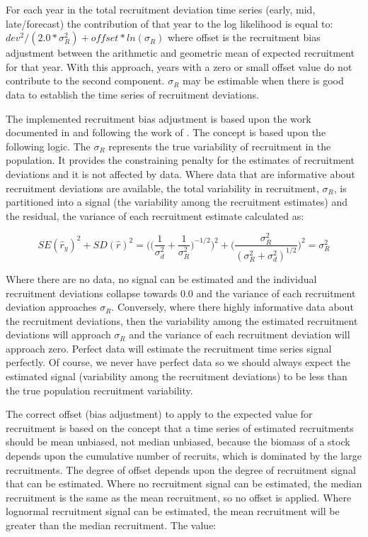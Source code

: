 \hypertarget{RecBias}{}
For each year in the total recruitment deviation time series (early, mid, late/forecast) the contribution of that year to the log likelihood is equal to: $dev^2/(2.0*\sigma^2_R)+offset*ln(\sigma_R)$ where offset is the recruitment bias adjustment between the arithmetic and geometric mean of expected recruitment for that year. With this approach, years with a zero or small offset value do not contribute to the second component. $\sigma_R$ may be estimable when there is good data to establish the time series of recruitment deviations.

The implemented recruitment bias adjustment is based upon the work documented in \citet{methot-adjusting-2011} and following the work of \citet{maunder-estimation-2003}. The concept is based upon the following logic. The $\sigma_R$ represents the true variability of recruitment in the population. It provides the constraining penalty for the estimates of recruitment deviations and it is not affected by data. Where data that are informative about recruitment deviations are available, the total variability in recruitment, $\sigma_R$, is partitioned into a signal (the variability among the recruitment estimates) and the residual, the variance of each recruitment estimate calculated as:

\begin{equation}
SE(\hat{r}_y)^2 + SD(\hat{r})^2=\Bigg( \bigg( \frac{1}{\sigma^2_d}+\frac{1}{\sigma^2_R}\bigg)^{-1/2}\Bigg)^2+\Bigg( \frac{\sigma^2_R}{(\sigma^2_R+\sigma^2_d)^{1/2}}\Bigg)^2=\sigma^2_R
\end{equation}

Where there are no data, no signal can be estimated and the individual recruitment deviations collapse towards 0.0 and the variance of each recruitment deviation approaches $\sigma_R$. Conversely, where there highly informative data about the recruitment deviations, then the variability among the estimated recruitment deviations will approach $\sigma_R$ and the variance of each recruitment deviation will approach zero. Perfect data will estimate the recruitment time series signal perfectly. Of course, we never have perfect data so we should always expect the estimated signal (variability among the recruitment deviations) to be less than the true population recruitment variability.


The correct offset (bias adjustment) to apply to the expected value for recruitment is based on the concept that a time series of estimated recruitments should be mean unbiased, not median unbiased, because the biomass of a stock depends upon the cumulative number of recruits, which is dominated by the large recruitments. The degree of offset depends upon the degree of recruitment signal that can be estimated. Where no recruitment signal can be estimated, the median recruitment is the same as the mean recruitment, so no offset is applied. Where lognormal recruitment signal can be estimated, the mean recruitment will be greater than the median recruitment. The value:

